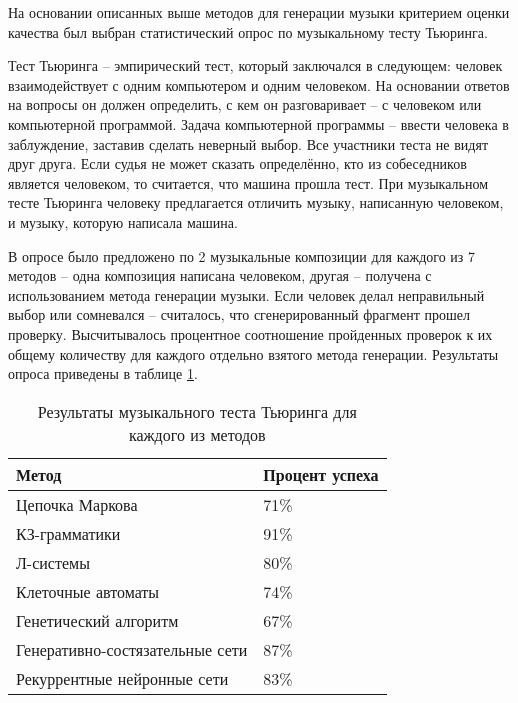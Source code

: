 На основании описанных выше методов  для генерации музыки критерием оценки качества был выбран статистический опрос по музыкальному тесту Тьюринга.

Тест Тьюринга -- эмпирический тест, который заключался в следующем: человек взаимодействует с одним компьютером и одним человеком. На основании ответов на вопросы он должен определить, с кем он разговаривает -- с человеком или компьютерной программой. Задача компьютерной программы -- ввести человека в заблуждение, заставив сделать неверный выбор. Все участники теста не видят друг друга. Если судья не может сказать определённо, кто из собеседников является человеком, то считается, что машина прошла тест. При музыкальном тесте Тьюринга человеку предлагается отличить музыку, написанную человеком, и музыку, которую написала машина.

В опросе было предложено по 2 музыкальные композиции для каждого из 7 методов -- одна композиция написана человеком, другая -- получена с использованием метода генерации музыки. Если человек делал неправильный выбор или сомневался -- считалось, что сгенерированный фрагмент прошел проверку. Высчитывалось процентное соотношение пройденных проверок к их общему количеству для каждого отдельно взятого метода генерации. Результаты опроса приведены в таблице \ref{tbl:survey_result}. 


\begin{center}
    \captionsetup{justification=raggedright,singlelinecheck=off}
    \begin{longtable}[c]{|l|l|}
    \caption{\label{tbl:survey_result} Результаты музыкального теста Тьюринга для каждого из методов}\\ \hline
        Метод & Процент успеха \\
        \hline
        Цепочка Маркова & 71\% \\
        \hline
        КЗ-грамматики & 91\% \\
        \hline
        Л-системы & 80\% \\
        \hline
        Клеточные автоматы & 74\% \\
        \hline
        Генетический алгоритм & 67\% \\
        \hline
        Генеративно-состязательные сети & 87\% \\
        \hline
        Рекуррентные нейронные сети & 83\% \\
        \hline
    \end{longtable}
\end{center}


